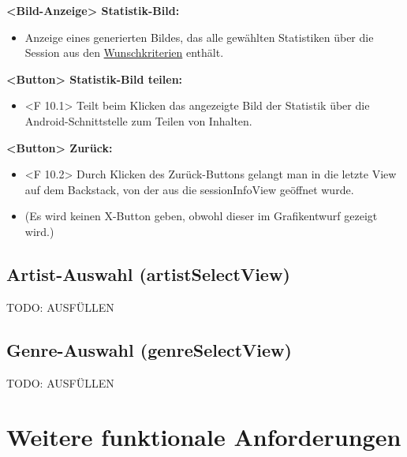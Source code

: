 \documentclass[oneside, ngerman]{sdqtechreport}
\begin{document}
\textbf{<Bild-Anzeige> Statistik-Bild:}
\begin{itemize}
    \item Anzeige eines generierten Bildes, das alle gewählten Statistiken über die Session aus den \hyperlink{Wunschkriterien}{Wunschkriterien} enthält.
\end{itemize}

\textbf{<Button> Statistik-Bild teilen:}
\begin{itemize}
    \item <F 10.1> Teilt beim Klicken das angezeigte Bild der Statistik über die Android-Schnittstelle zum Teilen von Inhalten.
\end{itemize}

\textbf{<Button> Zurück:}
\begin{itemize}
    \item <F 10.2> Durch Klicken des Zurück-Buttons gelangt man in die letzte View auf dem Backstack, von der aus die sessionInfoView geöffnet wurde.
    \item (Es wird keinen X-Button geben, obwohl dieser im Grafikentwurf gezeigt wird.)
\end{itemize}



\subsection{Artist-Auswahl (artistSelectView)}
\label{sec:Benutzeroberfläche:artistSelectView}

\hypertarget{artistSelectView}{}
TODO: AUSFÜLLEN


\subsection{Genre-Auswahl (genreSelectView)}
\label{sec:Benutzeroberfläche:genreSelectView}

\hypertarget{genreSelectView}{}
TODO: AUSFÜLLEN






\section{Weitere funktionale Anforderungen}
\label{sec:Benutzeroberfläche:Grafiken}
\end{document}

